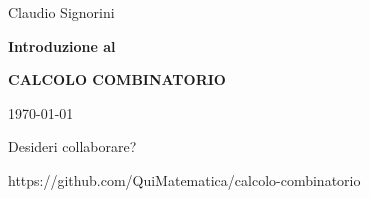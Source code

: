 \begin{titlepage}
    \begin{center}
        \vspace*{1cm}
        
        \LARGE
        Claudio Signorini
        
        \vspace{1.5cm}
        
        \Huge
        \textbf{Introduzione al}

        \textbf{CALCOLO COMBINATORIO}
        
        \vspace{1.5cm}
                    
        \LARGE
        \today

        \vfill

        \normalsize
        Desideri collaborare?

        https://github.com/QuiMatematica/calcolo-combinatorio
        
    \end{center}
\end{titlepage}